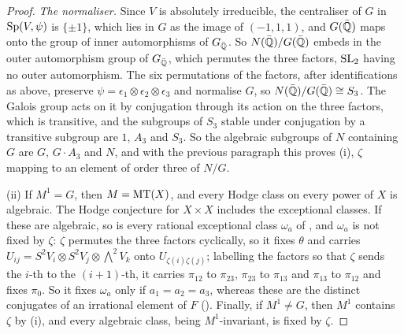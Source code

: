 \begin{proof}
\emph{The normaliser.} Since $V$ is absolutely irreducible, the centraliser of
$G$ in $\operatorname{Sp}(V,\psi)$ is $\{\pm1\}$, which lies in $G$ as the image of
$(-1,1,1)$, and $G(\bar{\mathbb{Q}})$ maps onto the group of inner automorphisms of
$G_{\bar{\mathbb{Q}}}$. So $N(\bar{\mathbb{Q}})/G(\bar{\mathbb{Q}})$ embeds in the outer
automorphism group of $G_{\bar{\mathbb{Q}}}$, which permutes the three factors,
$\operatorname{SL}_{2}$ having no outer automorphism. The six permutations of the factors,
after identifications as above, preserve $\psi=\epsilon_{1}\otimes
\epsilon_{2}\otimes\epsilon_{3}$ and normalise $G$, so
$N(\bar{\mathbb{Q}})/G(\bar{\mathbb{Q}})\cong S_{3}$. The Galois group acts on it by
conjugation through its action on the three factors, which is transitive, and
the subgroups of $S_{3}$ stable under conjugation by a transitive subgroup are
$1$, $A_{3}$ and $S_{3}$. So the algebraic subgroups of $N$ containing $G$ are
$G$, $G\cdot A_{3}$ and $N$, and with the previous paragraph this proves (i),
$\zeta$ mapping to an element of order three of $N/G$.

(ii) If $M^{1}=G$, then $M=\operatorname{MT}(X)$, and every Hodge class on every power of
$X$ is algebraic. The Hodge conjecture for $X\times X$ includes the
exceptional classes. If these are algebraic, so is every rational exceptional
class $\omega_{a}$ of , and $\omega_{a}$ is not fixed by
$\zeta$: $\zeta$ permutes the three factors cyclically, so it fixes $\theta$
and carries $U_{ij}=S^{2}V_{i}\otimes S^{2}V_{j}\otimes{\textstyle\bigwedge^{2}}V_{k}$
onto $U_{\zeta(i)\zeta(j)}$; labelling the factors so that $\zeta$ sends the
$i$-th to the $(i+1)$-th, it carries $\pi_{12}$ to $\pi_{23}$, $\pi_{23}$ to
$\pi_{13}$ and $\pi_{13}$ to $\pi_{12}$ and fixes $\pi_{0}$. So it fixes
$\omega_{a}$ only if $a_{1}=a_{2}=a_{3}$, whereas these are the distinct
conjugates of an irrational element of $F$ (). Finally,
if $M^{1}\ne G$, then $M^{1}$ contains $\zeta$ by (i), and every algebraic
class, being $M^{1}$-invariant, is fixed by $\zeta$.


\end{proof}
